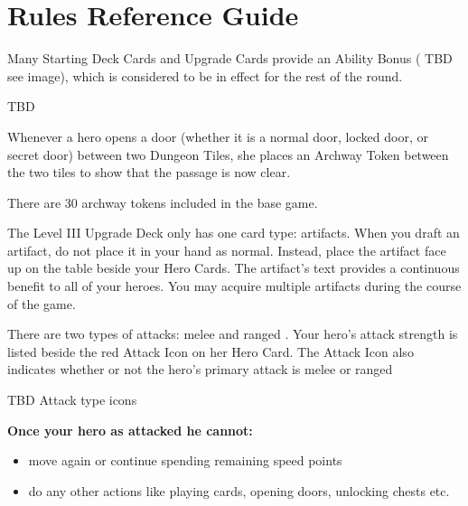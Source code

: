 \section{Rules Reference Guide}
\label{sec:RulesReferenceGuide}

Many Starting Deck Cards and Upgrade Cards provide an Ability Bonus ( TBD see image), which is considered to be in effect for the rest of the round.

TBD


Whenever a hero opens a door (whether it is a normal door, locked door, or secret door) between two Dungeon Tiles, she places an Archway Token between the two tiles to show that the passage is now clear.

There are 30 archway tokens included in the base game.


The Level III Upgrade Deck only has one card type: artifacts. When you draft an artifact, do not place it in your hand as normal. Instead, place the artifact face up on the table beside your Hero Cards. The artifact’s text provides a continuous benefit to all of your heroes. You may acquire multiple artifacts during the course of the game.


There are two types of attacks: melee and ranged . Your hero’s attack strength is listed beside the red Attack Icon on her Hero Card. The Attack Icon also indicates whether or not the hero’s primary attack is melee or ranged

TBD Attack type icons

\textbf{Once your hero as attacked he cannot:}
\begin{itemize}
  \item move again or continue spending remaining speed points
  \item do any other actions like playing cards, opening doors, unlocking chests etc.
\end{itemize}




